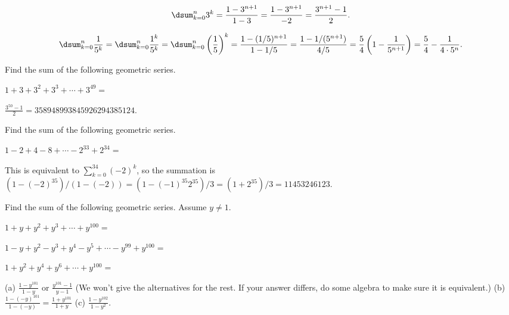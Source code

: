 \begin{exa}
$$\dsum _{k=0}^n 3^k =\dfrac{1-3^{n+1}}{1-3}=\dfrac{1-3^{n+1}}{-2}=\dfrac{3^{n+1}-1}{2}.$$
\end{exa}

\begin{exa}
$$\dsum _{k=0}^n \dfrac{1}{5^k} 
=\dsum _{k=0}^n \dfrac{1^k}{5^k} 
=\dsum _{k=0}^n \left(\dfrac{1}{5}\right)^k
=\dfrac{1-(1/5)^{n+1}}{1-1/5}
=\dfrac{1-1/(5^{n+1})}{4/5}
=\dfrac{5}{4}\left(1-\dfrac{1}{5^{n+1}}\right)
=\dfrac{5}{4}-\dfrac{1}{4\cdot5^{n}}.$$
\end{exa}

\begin{exer}
Find the sum of the following geometric series.

\noindent
$1 + 3 + 3^2 + 3^3 + \cdots + 3^{49}=$ 
\vspace*{1in}
\begin{answer}
$\frac{3^{50} - 1}{2}=358948993845926294385124$.
\end{answer}
\end{exer}

\begin{exer}
Find the sum of the following geometric series.

\noindent
$1-2+4-8+\cdots-2^{33}+2^{34}=$

\vspace*{1in}
\begin{answer}
This is equivalent to $\sum_{k=0}^{34}(-2)^k$,
 so the summation is 
 $(1-(-2)^{35})/(1-(-2))=(1-(-1)^{35}2^{35})/3=(1+2^{35})/3=11453246123$.
\end{answer}
\end{exer}

\begin{exer}
Find the sum of the following geometric series.
Assume $y\neq 1$.
\begin{lenum}
\item 
$1 + y + y^2 + y^3 + \cdots + y^{100}=$

\vspace*{1in}
\item 
$1 - y + y^2 - y^3 + y^4 - y^5 +  \cdots - y^{99}+ y^{100}=$

\vspace*{1.in}
\item 
$1 + y^2 + y^4 + y^6 + \cdots + y^{100}=$

\vspace*{1.1in}
\end{lenum}
\begin{answer}
 (a) $\frac{1 - y^{101}}{1 - y}$ or $\frac{y^{101}-1}{y-1}$ (We won't give the alternatives for the rest.
 If your answer differs, do some algebra to make sure it is equivalent.)
 (b) $\frac{1 -(-y)^{101}}{1 - (-y)} = \frac{1 + y^{101}}{1 + y}$
 (c) $\frac{1 - y^{102}}{1 - y^2}$.
\end{answer}
\end{exer}

